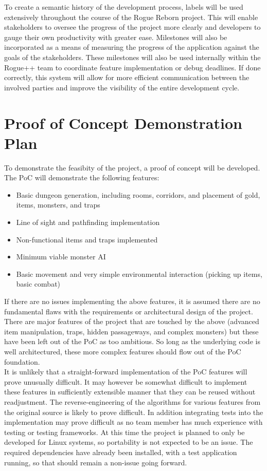 \documentclass{article}
\begin{document}
To create a semantic history of the development process, labels will be used extensively throughout the course of the Rogue Reborn project.  This will enable stakeholders to oversee the progress of the project more clearly and developers to gauge their own productivity with greater ease.  Milestones will also be incorporated as a means of measuring the progress of the application against the goals of the stakeholders.  These milestones will also be used internally within the Rogue++ team to coordinate feature implementation or debug deadlines. If done correctly, this system will allow for more efficient communication between the involved parties and improve the visibility of the entire development cycle.

\section{Proof of Concept Demonstration Plan}

To demonstrate the feasibity of the project, a proof of concept will be developed. The PoC will demonstrate the following features:

\begin{itemize}
	\item Basic dungeon generation, including rooms, corridors, and placement of gold, items, monsters, and traps
	\item Line of sight and pathfinding implementation
	\item Non-functional items and traps implemented
	\item Minimum viable monster AI
	\item Basic movement and very simple environmental interaction (picking up items, basic combat)
\end{itemize}

If there are no issues implementing the above features, it is assumed there are no fundamental flaws with the requirements or architectural design of the project. There are major features of the project that are touched by the above (advanced item manipulation, traps, hidden passageways, and complex monsters) but these have been left out of the PoC as too ambitious. So long as the underlying code is well architectured, these more complex features should flow out of the PoC foundation.\\

It is unlikely that a straight-forward implementation of the PoC features will prove unusually difficult. It may however be somewhat difficult to implement these features in sufficiently extensible manner that they can be reused without readjustment. The reverse-engineering of the algorithms for various features from the original source is likely to prove difficult. In addition integrating tests into the implementation may prove difficult as no team member has much experience with testing or testing frameworks. At this time the project is planned to only be developed for Linux systems, so portability is not expected to be an issue. The required dependencies have already been installed, with a test application running, so that should remain a non-issue going forward. 
\end{document}
